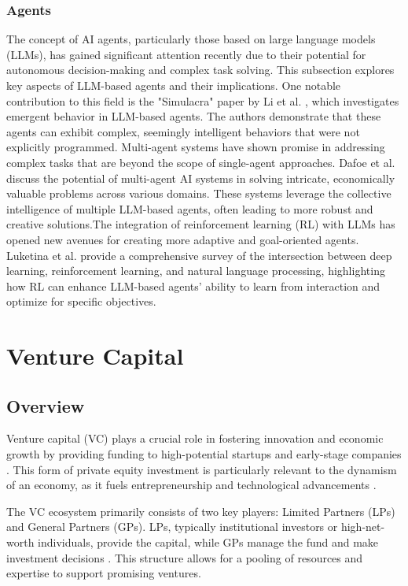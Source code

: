 \documentclass[a4paper, oneside]{discothesis}
\begin{document}
\subsection{Agents}
The concept of AI agents, particularly those based on large language models (LLMs), has gained significant attention recently due to their potential for autonomous decision-making and complex task solving. This subsection explores key aspects of LLM-based agents and their implications.
One notable contribution to this field is the "Simulacra" paper by Li et al. \cite{li2023simulacra}, which investigates emergent behavior in LLM-based agents. The authors demonstrate that these agents can exhibit complex, seemingly intelligent behaviors that were not explicitly programmed.
Multi-agent systems have shown promise in addressing complex tasks that are beyond the scope of single-agent approaches. Dafoe et al. \cite{dafoe2020open} discuss the potential of multi-agent AI systems in solving intricate, economically valuable problems across various domains.
These systems leverage the collective intelligence of multiple LLM-based agents, often leading to more robust and creative solutions.The integration of reinforcement learning (RL) with LLMs has opened new avenues for creating more adaptive and goal-oriented agents. Luketina et al. \cite{luketina2019survey} provide a comprehensive survey of the intersection between deep learning, reinforcement learning, and natural language processing, highlighting how RL can enhance LLM-based agents' ability to learn from interaction and optimize for specific objectives.

\chapter{Venture Capital}
\section{Overview}
Venture capital (VC) plays a crucial role in fostering innovation and economic growth by providing funding to high-potential startups and early-stage companies \cite{gompers2001venture}. This form of private equity investment is particularly relevant to the dynamism of an economy, as it fuels entrepreneurship and technological advancements \cite{kortum2000assessing_contribution_venture_capital}.

The VC ecosystem primarily consists of two key players: Limited Partners (LPs) and General Partners (GPs). LPs, typically institutional investors or high-net-worth individuals, provide the capital, while GPs manage the fund and make investment decisions \cite{metrick2010venture}. This structure allows for a pooling of resources and expertise to support promising ventures.
\end{document}

